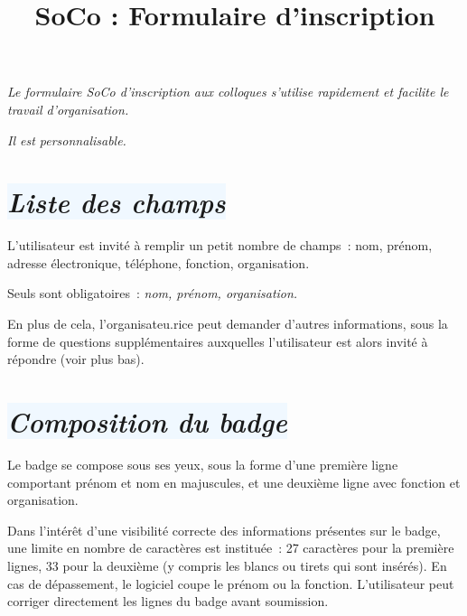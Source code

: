 \documentclass[10pt,a4paper]{article}
\title{\bfseries{SoCo : Formulaire d'inscription}}
\author{}
\date{}
\newcommand{\bleupale}[1]{\colorbox{AliceBlue}{#1}}
\begin{document}
\pagestyle{empty}


\maketitle

\emph{Le formulaire SoCo d'inscription aux colloques s'utilise rapidement et facilite le travail d'organisation.}

\emph{Il est personnalisable.}


\section*{\bleupale{\emph{Liste des champs}}}

L'utilisateur est invité à remplir un petit nombre de champs : nom, prénom, adresse électronique, téléphone, fonction, organisation.

Seuls sont obligatoires : \emph{nom, prénom, organisation.}

En plus de cela, l'organisateu.rice peut demander d'autres informations, sous la forme de questions supplémentaires auxquelles l'utilisateur est alors invité à répondre (voir plus bas).

\section*{\bleupale{\emph{Composition du badge}}}

Le badge se compose sous ses yeux, sous la forme d'une première ligne comportant prénom et nom en majuscules, et une deuxième ligne avec fonction et organisation.

Dans l'intérêt d'une visibilité correcte des informations présentes sur le badge, une limite en nombre de caractères est instituée : 27 caractères pour la première lignes, 33 pour la deuxième (y compris les blancs ou tirets qui sont insérés). En cas de dépassement, le logiciel coupe le prénom ou la fonction. L'utilisateur peut corriger directement les lignes du badge avant soumission.
\end{document}

